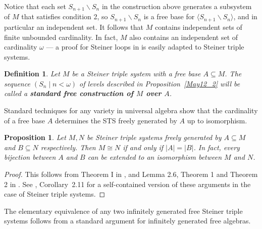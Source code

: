 \documentclass[a4paper, 11pt]{article}
\theoremstyle{note}
\newtheorem{df}[thm]{Definition}
\newtheorem{prop}[thm]{Proposition}
\begin{document}
Notice that each set $S_{n+1}\smallsetminus S_n$ in the construction above generates a subsystem of $M$ that satisfies condition 2, so  $S_{n+1}\smallsetminus S_n$ is a free base for $\langle S_{n+1}\smallsetminus S_n \rangle$, and in particular an independent set. It follows that $M$ contains independent sets of finite unbounded cardinality. In fact, $M$ also contains an independent set of cardinality $\omega$ --- a proof for Steiner loops in \cite{markovski} is easily adapted to Steiner triple systems.
  
		\begin{df} Let $M$ be a Steiner triple system with a free base $A\subseteq M$. The sequence $(S_n\mid n<\omega)$ of levels described in Proposition~\ref{May12_2} will be called a \textbf{standard free construction of $M$ over $A$}.
	\end{df}


	
Standard techniques for any variety in universal algebra show that the cardinality of a free base $A$ determines the STS freely generated by $A$ up to isomorphism. 

\begin{prop}\label{May11_9.1} Let $M,N$ be Steiner triple systems freely generated by $A\subseteq M$ and $B\subseteq N$ respectively. Then $M\cong N$ if and only if $|A|=|B|$. In fact, every bijection between $A$ and $B$ can be extended  to an isomorphism between $M$ and $N$.
	\end{prop}
	
	 \begin{proof} This follows from Theorem I in \cite{fujiwara}, and Lemma 2.6, Theorem 1 and Theorem 2 in \cite{jontarski}. See \cite{barcas2}, Corollary~2.11 for a self-contained version of these arguments in the  case of Steiner triple systems.
	\end{proof}
	
The elementary equivalence of any two infinitely generated free Steiner triple systems follows from a standard argument for infinitely generated free algebras.
	
	
	
\end{document}
